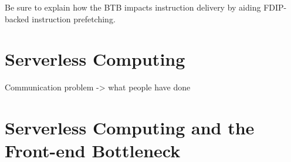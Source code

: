 \documentclass[../main.tex]{subfiles}
\begin{document}
\begin{refsection}
Be sure to explain how the BTB impacts instruction delivery by aiding FDIP-backed instruction prefetching.












\section{Serverless Computing}

Communication problem -> what people have done



\section{Serverless Computing and the Front-end Bottleneck}

\ifx\chapincluded\undefined
  \printbibliography
  \end{refsection}
 \fi
\end{document}
